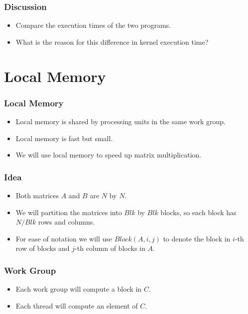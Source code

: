 \documentclass{beamer}
\begin{document}
\begin{frame}
  \frametitle{Discussion}
  \begin{itemize}
  \item Compare the execution times of the two programs.
  \item What is the reason for this difference in kernel execution
    time?
  \end{itemize}
\end{frame}

\section{Local Memory}

\begin{frame}
  \frametitle{Local Memory}
  \begin{itemize}
    \item Local memory is shared by processing units in the same work
      group.
    \item Local memory is fast but small.
    \item We will use local memory to speed up matrix multiplication.
  \end{itemize}
\end{frame}

\begin{frame}
  \frametitle{Idea}
  \begin{itemize}
    \item Both matrices $A$ and $B$ are $N$ by $N$.
    \item We will partition the matrices into $Blk$ by $Blk$ blocks,
      so each block has $N / Blk$ rows and columns.
    \item For ease of notation we will use $Block(A, i, j)$ to denote
      the block in $i$-th row of blocks and $j$-th column of blocks in
      $A$.
  \end{itemize}
\end{frame}

\begin{frame}
  \frametitle{Work Group}
  \begin{itemize}
  \item Each work group will compute a block in $C$.
  \item Each thread will compute an element of $C$.
  \end{itemize}
\end{frame}
\end{document}
